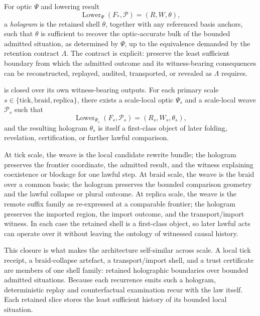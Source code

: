 \documentclass{aion}
\begin{document}
\begin{definition}
\label{def:warp-hologram}
	For optic \(\Psi\) and lowering result
	\[
		\operatorname{Lower}_{\Psi}(F_*, \mathcal{P}) = (R,W,\theta),
	\]
		a \emph{\WARP{} hologram} is the retained shell \(\theta\), together with any
		referenced basis anchors, such that \(\theta\) is sufficient to recover the
		optic-accurate bulk of the bounded admitted situation, as determined by
		\(\Psi\), up to the equivalence demanded by the retention contract
		\(\Lambda\). The contract is explicit: preserve the least sufficient boundary
		from which the admitted outcome and its witness-bearing consequences can be
		reconstructed, replayed, audited, transported, or revealed as \(\Lambda\)
		requires.
	\end{definition}

\begin{proposition}
\label{prop:closure-witness}
	\WARP{} is closed over its own witness-bearing outputs. For each primary scale
	\(s \in \{\mathrm{tick}, \mathrm{braid}, \mathrm{replica}\}\), there exists a
	scale-local optic \(\Psi_s\) and a scale-local weave
	\(\mathcal{P}_s\) such that
	\[
		\operatorname{Lower}_{\Psi_s}(F_s, \mathcal{P}_s)
		=
		(R_s,W_s,\theta_s),
	\]
	and the resulting hologram \(\theta_s\) is itself a first-class object of
	later folding, revelation, certification, or further lawful comparison.
\end{proposition}

\begin{argument}
	At tick scale, the weave is the local candidate rewrite
	bundle; the hologram preserves the frontier coordinate, the admitted result,
	and the witness explaining coexistence or blockage for one lawful step. At
		braid scale, the weave is the braid over a common basis; the
		hologram preserves the bounded comparison geometry and the lawful collapse or
		plural outcome. At replica scale, the weave is the remote
		suffix family as re-expressed at a comparable frontier; the hologram preserves
		the imported region, the import outcome, and the transport/import witness. In
		each case the retained shell is a first-class \WARP{} object, so later lawful
		acts can operate over it without leaving the ontology of witnessed causal
		history.
	\end{argument}

	This closure is what makes the architecture self-similar across scale. A local
	tick receipt, a braid-collapse artefact, a transport/import shell, and a trust
	certificate are members of one shell family: retained holographic boundaries
	over bounded admitted situations. Because each recurrence emits such a
	hologram, deterministic replay and counterfactual examination recur with the
	law itself. Each retained slice stores the least sufficient history of its
	bounded local situation.
\end{document}
